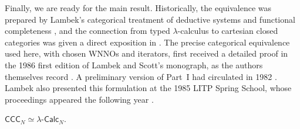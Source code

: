 Finally, we are ready for the main result. Historically, the equivalence was prepared by Lambek's categorical treatment of deductive systems and functional completeness \parencite{Lambek1968,Lambek1969,Lambek1972,Lambek1974}, and the connection from typed $\lambda$-calculus to cartesian closed categories was given a direct exposition in \cite{Lambek1980}.
The precise categorical equivalence used here, with chosen WNNOs and iterators, first received a detailed proof in the 1986 first edition of Lambek and Scott's monograph, as the authors themselves record \parencite[Part~I, Historical comments, \S~11, p.~117]{LambekScott1994}.
A preliminary version of Part~I had circulated in 1982 \parencite[Preface, p.~ix]{LambekScott1994}. Lambek also presented this formulation at the 1985 LITP Spring School, whose proceedings appeared the following year \parencite{Lambek1986}.

\begin{theorem}
    $\mathsf{CCC}_N \simeq \lambda\text{-}\mathsf{Calc}_N$.
\end{theorem}

